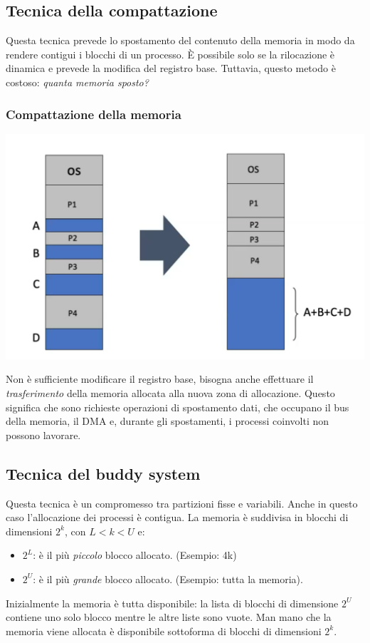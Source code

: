 \documentclass[a4paper,12pt, twoside]{report}
\begin{document}

\subsection{Tecnica della compattazione}
Questa tecnica prevede lo spostamento del contenuto della memoria in modo da rendere contigui i blocchi di un 
processo. \`E possibile solo se la rilocazione \`e dinamica e prevede la modifica del registro base. Tuttavia, questo 
metodo \`e costoso: \emph{quanta memoria sposto?}

\subsubsection{Compattazione della memoria}
\begin{multicols}{2}
\begin{center}
\includegraphics[scale=0.12]{comp_mem}
\end{center}

Non \`e sufficiente modificare il registro base, bisogna anche effettuare il \emph{trasferimento} della memoria allocata
alla nuova zona di allocazione. Questo significa che sono richieste operazioni di spostamento dati, che occupano il bus
della memoria, il DMA e, durante gli spostamenti, i processi coinvolti non possono lavorare. 
\end{multicols}
\subsection{Tecnica del buddy system}

Questa tecnica \`e un compromesso tra partizioni fisse e variabili. Anche in questo caso l'allocazione dei processi \`e 
contigua. La memoria \`e suddivisa in blocchi di dimensioni $2^k$, con $L<k<U$ e:
\begin{itemize}
\item $2^L$: \`e il pi\`u \emph{piccolo} blocco allocato. (Esempio: 4k)
\item $2^U$: \`e il pi\`u \emph{grande} blocco allocato. (Esempio: tutta la memoria).
\end{itemize}
Inizialmente la memoria \`e tutta disponibile: la lista di blocchi di dimensione $2^U$ contiene uno solo blocco mentre le
altre liste sono vuote. Man mano che la memoria viene allocata \`e disponibile sottoforma di blocchi di dimensioni $2^k$. 
\end{document}
